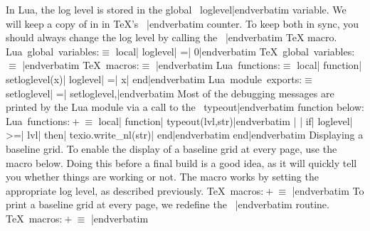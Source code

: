 In Lua, the log level is stored in the global \hbox{\verbatim
loglevel|endverbatim}{} variable.
We will keep a copy of in in \TeX's \hbox{\verbatim
\ccgridloglevel|endverbatim}{} counter. To keep both in
sync, you should always change the log level by calling the \hbox{\verbatim
\setccgridloglevel|endverbatim}{}
\TeX{} macro.
\Y\B\4\setbox\cctanglebox\hbox{Lua global variables}:\box\cctanglebox\X${}\equiv{}$\6
\verbatim
local| loglevel| =| 0|endverbatim\6
\fi
{}\B\4\setbox\cctanglebox\hbox{\TeX{} global variables}:\box\cctanglebox\X${}\equiv{}$\6
\verbatim
\newcount\ccgridloglevel{}|endverbatim\6
\fi
{}\B\4\setbox\cctanglebox\hbox{\TeX{} macros}:\box\cctanglebox\X${}\equiv{}$\6
\verbatim
\def\setccgridloglevel#1{%|endverbatim\6
\verbatim
| | \directlua{ccgrid.setloglevel(#1)}%
\verbatim
| | \global\ccgridloglevel=#1}|endverbatim\6
\fi
{}\B\4\setbox\cctanglebox\hbox{Lua functions}:\box\cctanglebox\X${}\equiv{}$\6
\verbatim
local| function| setloglevel(x)| loglevel| =| x| end|endverbatim\6
\fi
{}\B\4\setbox\cctanglebox\hbox{Lua module exports}:\box\cctanglebox\X${}\equiv{}$\6
\verbatim
setloglevel| =| setloglevel,|endverbatim\6
\fi
{}Most of the debugging messages are printed by the Lua module via a call
to the \hbox{\verbatim
typeout|endverbatim}{} function below:
\Y\B\4\setbox\cctanglebox\hbox{Lua functions}:\box\cctanglebox\X${}\mathrel+\equiv{}$\6
\verbatim
local| function| typeout(lvl,str)|endverbatim\6
\verbatim
| | if| loglevel| >=| lvl| then| texio.write_nl(str)| end|endverbatim\6
\verbatim
end|endverbatim\6
\fi
{}Displaying a baseline grid.
To enable the display of a baseline grid at every
page, use the macro below. Doing this before a final build is a good idea, as
it will quickly tell you whether things are working or not. The macro works
by setting the appropriate log level, as described previously.
\Y\B\4\setbox\cctanglebox\hbox{\TeX{} macros}:\box\cctanglebox\X${}\mathrel+\equiv{}$\6
\verbatim
\def\ccgriddraft{\setccgridloglevel{1}}|endverbatim\6
\fi
{}To print a baseline grid at every page, we redefine the \hbox{\verbatim
\output|endverbatim}{}
routine.
\Y\B\4\setbox\cctanglebox\hbox{\TeX{} macros}:\box\cctanglebox\X${}\mathrel+\equiv{}$\6
\verbatim
\newtoks\ccgrid@prevoutput|endverbatim\6

